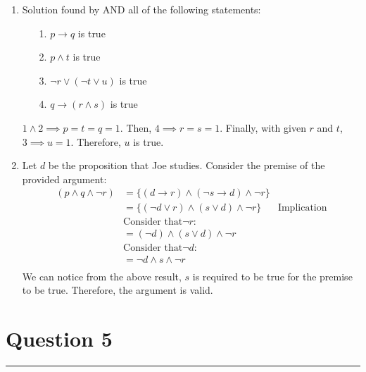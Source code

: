 \documentclass{article}
\begin{document}
\begin{enumerate}[label=\alph*.]
    \item Solution found by AND all of the following statements: \begin{enumerate}
              \item[1.] \( p \to q \) is true
              \item[2.] \( p \land t \) is true
              \item[3.] \( \neg r \lor (\neg t \lor u) \) is true
              \item[4.] \( q \to (r \land s) \) is true
          \end{enumerate}
          $1 \land 2 \implies p = t = q = 1$. Then, $4 \implies r = s = 1$. Finally, with given $r$ and $t$, $3 \implies u = 1$. Therefore, \( u \) is true.
    \item Let $d$ be the proposition that Joe studies. Consider the premise of the provided argument:
          \[\begin{aligned}
                  (p \land q \land \neg r) & = \{(d \to r) \land (\neg s \to d) \land \neg r\}                        \\
                                           & = \{(\neg d \lor r) \land (s \lor d) \land \neg r\} & \text{Implication} \\
                                           & \text{Consider that} \neg r:                                             \\
                                           & = (\neg d ) \land (s \lor d) \land \neg r                                \\
                                           & \text{Consider that} \neg d:                                             \\
                                           & =\neg d \land s \land \neg r                                             \\
              \end{aligned}
          \]
          We can notice from the above result, $s$ is required to be true for the premise to be true. Therefore, the argument is valid.
\end{enumerate}

\section*{Question 5}
\hrule
\vspace{0.5cm}
\end{document}
